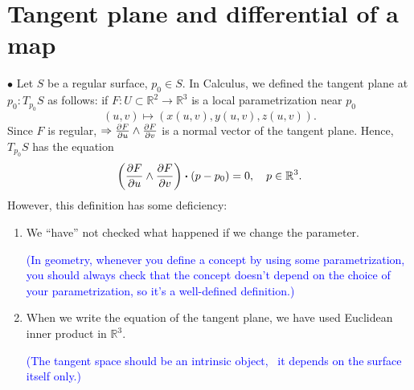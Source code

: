 \section{Tangent plane and differential of a map}
$\bullet$ Let $S$ be a regular surface, \(p_0\in S\). In Calculus, we
defined the tangent plane at \(p_0\colon T_{p_0}S\) as follows: if
\(F\colon U\subset \mathbb{R}^2\to \mathbb{R}^3\) is a local parametrization near \(p_0\)
\[
    (u,v)\mapsto \left(x(u,v),y(u,v),z(u,v)\right).
\]
Since \(F\) is regular, \(\Rightarrow \pdv{F}{u}\wedge\pdv
{F}{v}\) is a normal vector of the tangent plane. Hence,
\(T_{p_0}S\) has the equation
\[
    \left(\pdv{F}{u}\wedge\pdv{F}{v}\right)\vdot
    (p-p_0)=0,\quad p\in \mathbb{R}^3  .
\]
However, this definition has some deficiency:
\begin{enumerate}[(1)]
    \item We ``have'' not checked what happened if we change the parameter.

    \textcolor{blue}{(In geometry, whenever you define a concept by using
          some parametrization, you should always check that the concept doesn't
          depend on the choice of your parametrization, so it's a well-defined
          definition.)}
    \item When we write the equation of the tangent plane, we have used
      Euclidean inner product in $\mathbb{R}^3$.

      \textcolor{blue}{(The tangent space should be an intrinsic object, \ie\ it depends on the surface itself only.)}
\end{enumerate}
